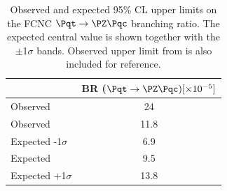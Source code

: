 \begin{table}[htbp]
	\centering
	\begin{tabular}{lc} 
		\toprule
		 								& BR ($\Pqt\rightarrow\PZ\Pqc) [\times 10^{-5}]$  \\
		\midrule
		Observed \cite{TOPQ-2017-06} 	 & 24 \\
		Observed  				   					& 11.8  \\
		Expected -1$\sigma$   				  &   6.9 \\
		Expected                    				&  9.5 \\
	    Expected +1$\sigma$  				 &  13.8 \\		
		\bottomrule
	\end{tabular}
	\caption{
		Observed and expected 95\% CL upper limits on the FCNC $\Pqt\rightarrow\PZ\Pqc$ branching ratio. 
		The expected central value is shown together with the $\pm$1$\sigma$ bands.
		Observed upper limit from \cite{TOPQ-2017-06} is also included for reference.
	}%
	\label{tab:results:limits_unb}
\end{table}

